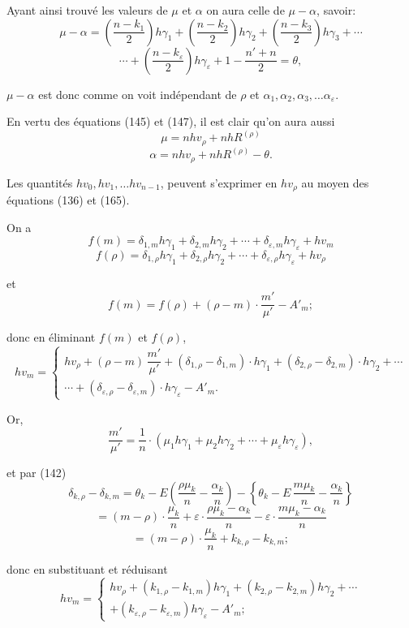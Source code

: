 \documentclass{article}
\begin{document}
Ayant ainsi trouvé les valeurs de $\mu$ et $\alpha$ on aura celle de $\mu-\alpha$, savoir:
\[ \mu-\alpha = \left(\frac{n-k_1}{2}\right)h\gamma_1 + \left(\frac{n-k_2}{2}\right)h\gamma_2 + \left(\frac{n-k_3}{2}\right)h\gamma_3+\cdots \]
\[ \cdots+\left(\frac{n-k_\varepsilon}{2}\right)h\gamma_\varepsilon+1-\frac{n'+n}{2} = \theta, \tag{172} \]

$\mu-\alpha$ est donc comme on voit indépendant de $\rho$ et $\alpha_1, \alpha_2, \alpha_3, \ldots \alpha_\varepsilon$.

En vertu des équations (145) et (147), il est clair qu'on aura aussi
\[ \mu = nhv_\rho + nhR^{(\rho)} \tag{173} \]
\[ \alpha = nhv_\rho + nhR^{(\rho)} - \theta. \tag{174} \]

Les quantités $hv_0, hv_1, \ldots hv_{n-1}$, peuvent s'exprimer en $hv_\rho$ au moyen des équations (136) et (165).

On a
\[ f(m) = \delta_{1,m}h\gamma_1+\delta_{2,m}h\gamma_2+\cdots+\delta_{\varepsilon,m}h\gamma_\varepsilon+hv_m \]
\[ f(\rho) = \delta_{1,\rho}h\gamma_1+\delta_{2,\rho}h\gamma_2+\cdots+\delta_{\varepsilon,\rho}h\gamma_\varepsilon+hv_\rho \]

et
\[ f(m) = f(\rho) + (\rho-m) \cdot \frac{m'}{\mu'} - A'_m; \]

donc en éliminant $f(m)$ et $f(\rho)$,
\[ hv_m = \begin{cases}
hv_\rho + (\rho-m)\,\dfrac{m'}{\mu'} + (\delta_{1,\rho}-\delta_{1,m}) \cdot h\gamma_1 + (\delta_{2,\rho}-\delta_{2,m}) \cdot h\gamma_2 + \cdots \\
\cdots + (\delta_{\varepsilon,\rho}-\delta_{\varepsilon,m}) \cdot h\gamma_\varepsilon - A'_m.
\end{cases} \]

Or,
\[ \frac{m'}{\mu'} = \frac{1}{n} \cdot (\mu_1 h\gamma_1+\mu_2 h\gamma_2+\cdots+\mu_\varepsilon h\gamma_\varepsilon), \]

et par (142)
\[ \delta_{k,\rho} - \delta_{k,m} = \theta_k - E\left(\frac{\rho\mu_k}{n}-\frac{\alpha_k}{n}\right) - \left\{\theta_k - E\,\frac{m\mu_k}{n}-\frac{\alpha_k}{n}\right\} \]
\[ = (m-\rho) \cdot \frac{\mu_k}{n} + \varepsilon \cdot \frac{\rho\mu_k-\alpha_k}{n} - \varepsilon \cdot \frac{m\mu_k-\alpha_k}{n} \]
\[ = (m-\rho) \cdot \frac{\mu_k}{n} + k_{k,\rho} - k_{k,m}; \]

donc en substituant et réduisant
\[ hv_m = \begin{cases}
hv_\rho + (k_{1,\rho}-k_{1,m})h\gamma_1 + (k_{2,\rho}-k_{2,m})h\gamma_2 + \cdots \\
+ (k_{\varepsilon,\rho}-k_{\varepsilon,m})h\gamma_\varepsilon - A'_m;
\end{cases} \]
\end{document}
